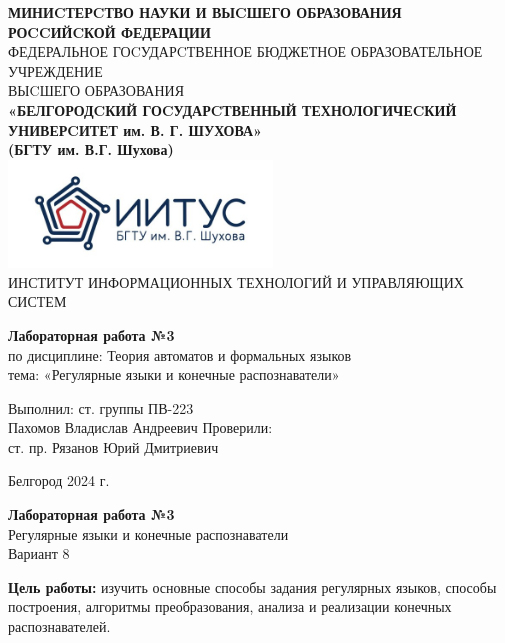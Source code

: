 \documentclass[a4paper,14pt]{extarticle}
\newcommand\textbox[1]{
	\parbox{.45\textwidth}{#1}
}
\begin{document}
\begin{center}
    \small{
        \textbf{МИНИCТЕРCТВО НАУКИ И ВЫCШЕГО ОБРАЗОВАНИЯ РОCCИЙCКОЙ ФЕДЕРАЦИИ}\\
        ФЕДЕРАЛЬНОЕ ГОCУДАРCТВЕННОЕ БЮДЖЕТНОЕ ОБРАЗОВАТЕЛЬНОЕ УЧРЕЖДЕНИЕ\\ВЫCШЕГО ОБРАЗОВАНИЯ \\
        \textbf{«БЕЛГОРОДCКИЙ ГОCУДАРCТВЕННЫЙ ТЕХНОЛОГИЧЕCКИЙ\\УНИВЕРCИТЕТ им. В. Г. ШУХОВА»\\ (БГТУ им. В.Г. Шухова)} \\
        \bigbreak
        \includegraphics[width=70mm]{log}\\
        ИНСТИТУТ ИНФОРМАЦИОННЫХ ТЕХНОЛОГИЙ И УПРАВЛЯЮЩИХ СИСТЕМ\\}
\end{center}

\vfill
\begin{center}
    \large{
        \textbf{
            Лабораторная работа №3}}\\
    \normalsize{
        по дисциплине: Теория автоматов и формальных языков \\
        тема: «Регулярные языки и конечные распознаватели»}
\end{center}
\vfill
\hfill\textbox{
    Выполнил: ст. группы ПВ-223\\Пахомов Владислав Андреевич
    \bigbreak
    Проверили: \\ст. пр. Рязанов Юрий Дмитриевич
}
\vfill\begin{center}
    Белгород 2024 г.
\end{center}
\newpage
\begin{center}
    \textbf{Лабораторная работа №3}\\
    Регулярные языки и конечные распознаватели\\
    Вариант 8
\end{center}
\textbf{Цель работы: }изучить основные способы задания регулярных языков, 
способы построения, алгоритмы преобразования, анализа и реализации конечных 
распознавателей.\\
\end{document}
